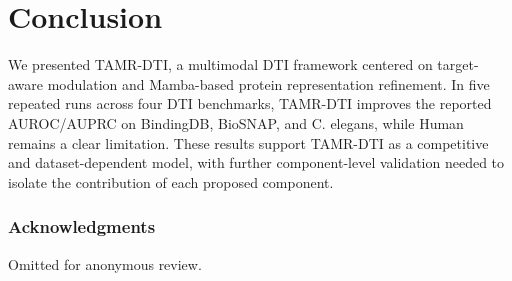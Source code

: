 \section{Conclusion}

We presented TAMR-DTI, a multimodal DTI framework centered on target-aware modulation and Mamba-based protein representation refinement. In five repeated runs across four DTI benchmarks, TAMR-DTI improves the reported AUROC/AUPRC on BindingDB, BioSNAP, and C. elegans, while Human remains a clear limitation. These results support TAMR-DTI as a competitive and dataset-dependent model, with further component-level validation needed to isolate the contribution of each proposed component.

\subsubsection*{Acknowledgments}
Omitted for anonymous review.

